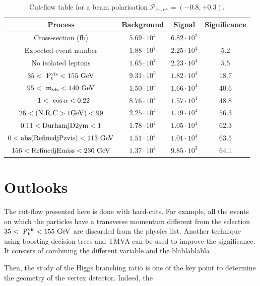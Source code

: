   \begin{table}
    \begin{tabular}{c c c c}
      \hline
      Process                                     & Background          & Signal              & Significance  \tabularnewline
      \hline
      \hline
      Cross-section (fb)                          & $5.69 \cdot 10^{4}$ & $6.82 \cdot 10^{2}$ &               \tabularnewline
      Expected event number                       & $1.88 \cdot 10^{7}$ & $2.25 \cdot 10^{4}$ & $5.2$         \tabularnewline
      No isolated leptons                         & $1.65 \cdot 10^{7}$ & $2.23 \cdot 10^{4}$ & $5.5$         \tabularnewline
      {$35 <~\rm{{P}_{t}^{vis}} < 155~\rm{GeV} $} & $9.31 \cdot 10^{5}$ & $1.82 \cdot 10^{4}$ & $18.7$        \tabularnewline
      {$95 <~\rm{m_{vis}}< 140~\rm{GeV}$}         & $1.50 \cdot 10^{5}$ & $1.66 \cdot 10^{4}$ & $40.6$        \tabularnewline
      {$-1 <~\rm{\cos{\alpha}}< 0.22$}            & $8.76 \cdot 10^{4}$ & $1.57 \cdot 10^{4}$ & $48.8$        \tabularnewline
      $26 < (\rm{N.R.C > 1GeV}) < 99$                    & $2.25 \cdot 10^{4}$ & $1.19 \cdot 10^{4}$ & $56.3$        \tabularnewline
      $0.11 < \rm{DurhamjD2ym} < 1$               & $1.78 \cdot 10^{4}$ & $1.05 \cdot 10^{4}$ & $62.3$        \tabularnewline
      $0 < \rm{abs(RefinedjPzvis)} < 113~\rm{GeV}$& $1.51 \cdot 10^{4}$ & $1.01 \cdot 10^{4}$ & $63.5$        \tabularnewline
      $156 < \rm{RefinedjEmiss} < 230~\rm{GeV}$   & $1.37 \cdot 10^{4}$ & $9.85 \cdot 10^{3}$ & $64.1$        \tabularnewline      
    \end{tabular}
    \caption{Cut-flow table for a beam polarisation $\mathcal{P}_{e^{-},e^{+}} = (-0.8, +0.3)$.}
    \label{tab:cutFlow}
  \end{table}

  \section{Outlooks}

  The cut-flow presented here is done with hard-cuts.
  For example, all the events on which the particles have a transverse momentum different from the selection $35 <~\rm{{P}_{t}^{vis}} < 155~\rm{GeV}$ are discarded from the physics list.
  Another technique using boosting decision trees and TMVA can be used to improve the significance.
  It consists of combining the different variable and the  blablablabla

  Then, the study of the Higgs branching ratio is one of the key point to determine the geometry of the vertex detector.
  Indeed, the 
